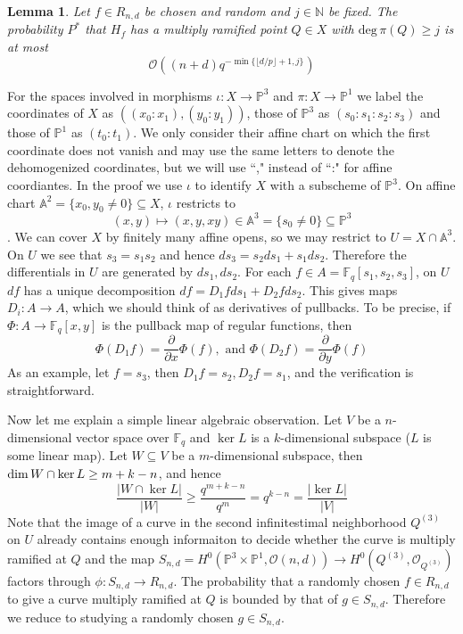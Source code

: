 \documentclass[12pt]{article}
\theoremstyle{plain}
\newtheorem{lemma}[equation]{Lemma}
\theoremstyle{definition}
\newcommand{\IA}{\mathbb{A}}
\newcommand{\IN}{\mathbb{N}}
\newcommand{\IF}{\mathbb{F}}
\newcommand{\IP}{\mathbb{P}}
\newcommand{\sO}{\mathcal{O}}
\renewcommand{\deg}{\mathrm{deg}\,}
\renewcommand\dim{{\rm dim\,}}
\newcommand{\<}{\langle}
\renewcommand{\>}{\rangle}
\newcommand{\p}{\partial}
\begin{document}
\begin{lemma}
Let $f \in R_{n, d}$ be chosen and random and $j \in \IN$ be fixed. The probability $P^*$ that $H_f$ has a multiply ramified point $Q \in X$ with $\deg \pi(Q) \ge j$ is at most
$$ \sO((n + d)q^{- \min\{ \lfloor d/p \rfloor + 1, j    \}})$$
\end{lemma}
For the spaces involved in morphisms $\iota : X \to \IP^3$ and $\pi : X \to \IP^1$ we label the coordinates of $X$ as $((x_0 : x_1), (y_0 : y_1))$, those of $\IP^3$ as $(s_0 : s_1 : s_2 : s_3)$ and those of $\IP^1$ as $(t_0 : t_1)$. We only consider their affine chart on which the first coordinate does not vanish and may use the same letters to denote the dehomogenized coordinates, but we will use ``," instead of ``:" for affine coordiantes. In the proof we use $\iota$ to identify $X$ with a subscheme of $\IP^3$. On affine chart $\IA^2 = \{ x_0, y_0 \neq 0 \} \subseteq X$, $\iota$ restricts to $$(x, y) \mapsto (x, y, xy) \in \IA^3 = \{s_0 \neq 0\} \subseteq \IP^3$$. We can cover $X$ by finitely many affine opens, so we may restrict to $U = X \cap \IA^3$. On $U$ we see that $s_3 = s_1 s_2$ and hence $ds_3 = s_2 ds_1 + s_1 ds_2$. Therefore the differentials in $U$ are generated by $ds_1, ds_2$. For each $f \in A = \IF_q[s_1, s_2, s_3]$, on $U$ $df$ has a unique decomposition $df = D_1 f ds_1 + D_2 f ds_2$. This gives maps $D_i : A \to A$, which we should think of as derivatives of pullbacks. To be precise, if $\Phi : A \to \IF_q[x, y]$ is the pullback map of regular functions, then $$\Phi(D_1 f) = \frac{\p}{\p x} \Phi(f), \text{ and }\Phi(D_2 f) = \frac{\p}{\p y} \Phi(f)$$ As an example, let $f = s_3$, then $D_1 f = s_2, D_2 f = s_1$, and the verification is straightforward. 

Now let me explain a simple linear algebraic observation. Let $V$ be a $n$-dimensional vector space over $\IF_q$ and $\ker L$ is a $k$-dimensional subspace ($L$ is some linear map). Let $W \subseteq V$ be a $m$-dimensional subspace, then $\dim W \cap \ker L \ge m + k - n$, and hence $$\frac{|W \cap \ker L|}{|W|} \ge \frac{q^{m + k - n}}{q^m} = q^{k - n} = \frac{|\ker L|}{|V|}$$ Note that the image of a curve in the second infinitestimal neighborhood $Q^{(3)}$ on $U$ already contains enough informaiton to decide whether the curve is multiply ramified at $Q$ and the map $S_{n, d} = H^0(\IP^3 \times \IP^1, \sO(n, d)) \to H^0(Q^{(3)}, \sO_{Q^{(3)}})$ factors through $\phi : S_{n, d} \to R_{n, d}$. The probability that a randomly chosen $f \in R_{n, d}$ to give a curve multiply ramified at $Q$ is bounded by that of $g \in S_{n, d}$. Therefore we reduce to studying a randomly chosen $g \in S_{n, d}$.  
\end{document}
